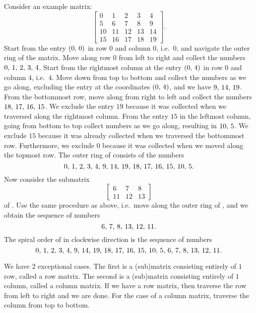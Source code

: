 Consider an example matrix:
\begin{equation}
\label{eqn:spiral:example_matrix}
\begin{bmatrix}
0  & 1  & 2  & 3  & 4  \\[4pt]
5  & 6  & 7  & 8  & 9  \\[4pt]
10 & 11 & 12 & 13 & 14 \\[4pt]
15 & 16 & 17 & 18 & 19
\end{bmatrix}.
\end{equation}
Start from the entry $\left( {0},\, {0} \right)$ in row $0$ and column $0$,
i.e.~$0$, and navigate the outer ring of the matrix.  Move along row
$0$ from left to right and collect the numbers
${0},\, {1},\, {2},\, {3},\, {4}$.  Start from the rightmost column at the
entry $\left( {0},\, {4} \right)$ in row $0$ and column $4$, i.e.~$4$.  Move down
from top to bottom and collect the numbers as we go along, excluding
the entry at the coordinates $\left( {0},\, {4} \right)$, and we have
${9},\, {14},\, {19}$.  From the bottommost row, move along from right
to left and collect the numbers ${18},\, {17},\, {16},\, {15}$.  We exclude
the entry $19$ because it was collected when we traversed along the
rightmost column.  From the entry $15$ in the leftmost column, going
from bottom to top collect numbers as we go along, resulting in
${10},\, {5}$.  We exclude $15$ because it was already collected
when we traversed the bottommost row.  Furthermore, we exclude $0$
because it was collected when we moved along the topmost row.  The
outer ring of  consists of the
numbers
\[
{0},\, {1},\, {2},\, {3},\, {4},\,
{9},\, {14},\, {19},\,
{18},\, {17},\, {16},\, {15},\,
{10},\, {5}.
\]
Now consider the submatrix
\begin{equation}
\label{eqn:spiral:example_matrix:submatrix}
\begin{bmatrix}
6  & 7  & 8  \\[4pt]
11 & 12 & 13
\end{bmatrix}
\end{equation}
of .  Use the same procedure as
above, i.e.~move along the outer ring of
, and we obtain the
sequence of numbers
\[
{6},\, {7},\, {8},\,
{13},\, {12},\, {11}.
\]
The spiral order of  in clockwise
direction is the sequence of numbers
\[
{0},\, {1},\, {2},\, {3},\, {4},\,
{9},\, {14},\, {19},\,
{18},\, {17},\, {16},\, {15},\,
{10},\, {5},\,
{6},\, {7},\, {8},\,
{13},\, {12},\, {11}.
\]

We have $2$ exceptional cases.  The first is a (sub)matrix consisting
entirely of $1$ row, called a row matrix.  The second is a (sub)matrix
consisting entirely of $1$ column, called a column matrix.  If we have
a row matrix, then traverse the row from left to right and we are
done.  For the case of a column matrix, traverse the column from top
to bottom.
